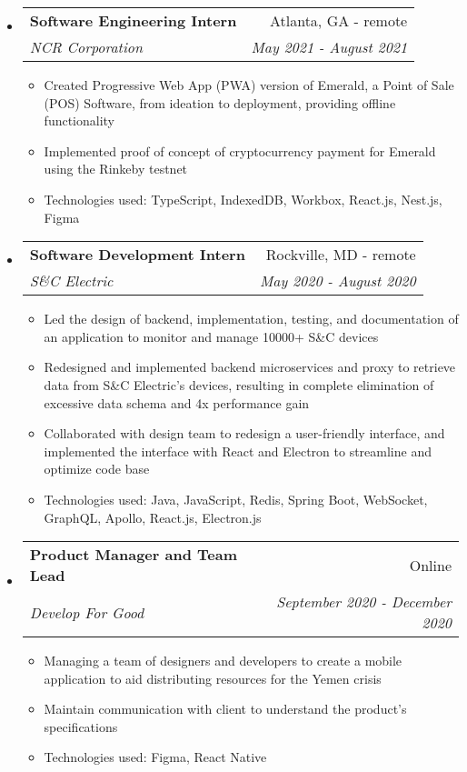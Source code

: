 \documentclass[letterpaper,10pt]{article}
\makeatletter
\newcommand{\resitem}[1]{\item #1 \vspace{-2pt}}
\newcommand{\ressubheading}[4]{
\begin{tabular*}{7.0in}{l@{\extracolsep{\fill}}r}
		\textbf{#1} & #2 \\
		\textit{#3} & \textit{#4} \\
\end{tabular*}\vspace{-6pt}}
\makeatother
\begin{document}
\begin{itemize}
\item
    \ressubheading{Software Engineering Intern}{Atlanta, GA - remote}{NCR Corporation}{May 2021 - August 2021}
    \begin{itemize}
        \resitem{Created Progressive Web App (PWA) version of Emerald, a Point of Sale (POS) Software, from ideation to deployment, providing offline functionality}
        \resitem{Implemented proof of concept of cryptocurrency payment for Emerald using the Rinkeby testnet}
        \resitem{Technologies used: TypeScript, IndexedDB, Workbox, React.js, Nest.js, Figma}
    \end{itemize}
\item
    \ressubheading{Software Development Intern}{Rockville, MD - remote}{S\&C Electric}{May 2020 - August 2020}
    \begin{itemize}
        \resitem{Led the design of backend, implementation, testing, and documentation of an application to monitor and manage 10000+ S\&C devices}
        \resitem{Redesigned and implemented backend microservices and proxy to retrieve data from S\&C Electric's devices, resulting in complete elimination of excessive data schema and 4x performance gain}
        \resitem{Collaborated with design team to redesign a user-friendly interface, and implemented the interface with React and Electron to streamline and optimize code base}
        \resitem{Technologies used: Java, JavaScript, Redis, Spring Boot, WebSocket, GraphQL, Apollo, React.js, Electron.js}
    \end{itemize}
\item
    \ressubheading{Product Manager and Team Lead}{Online}{Develop For Good}{September 2020 - December 2020}
    \begin{itemize}
        \resitem{Managing a team of designers and developers to create a mobile application to aid distributing resources for the Yemen crisis}
        \resitem{Maintain communication with client to understand the product's specifications}
        \resitem{Technologies used: Figma, React Native}
    \end{itemize}

\end{itemize}
\end{document}
